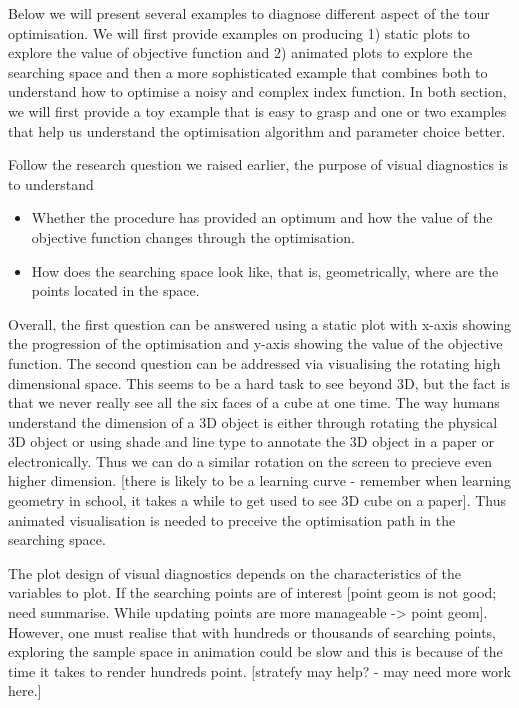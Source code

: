 \documentclass[12pt]{article}
\begin{document}
Below we will present several examples to diagnose different aspect of
the tour optimisation. We will first provide examples on producing 1)
static plots to explore the value of objective function and 2) animated
plots to explore the searching space and then a more sophisticated
example that combines both to understand how to optimise a noisy and
complex index function. In both section, we will first provide a toy
example that is easy to grasp and one or two examples that help us
understand the optimisation algorithm and parameter choice better.

Follow the research question we raised earlier, the purpose of visual
diagnostics is to understand

\begin{itemize}
\item
  Whether the procedure has provided an optimum and how the value of the
  objective function changes through the optimisation.
\item
  How does the searching space look like, that is, geometrically, where
  are the points located in the space.
\end{itemize}

Overall, the first question can be answered using a static plot with
x-axis showing the progression of the optimisation and y-axis showing
the value of the objective function. The second question can be
addressed via visualising the rotating high dimensional space. This
seems to be a hard task to see beyond 3D, but the fact is that we never
really see all the six faces of a cube at one time. The way humans
understand the dimension of a 3D object is either through rotating the
physical 3D object or using shade and line type to annotate the 3D
object in a paper or electronically. Thus we can do a similar rotation
on the screen to precieve even higher dimension. {[}there is likely to
be a learning curve - remember when learning geometry in school, it
takes a while to get used to see 3D cube on a paper{]}. Thus animated
visualisation is needed to preceive the optimisation path in the
searching space.

The plot design of visual diagnostics depends on the characteristics of
the variables to plot. If the searching points are of interest {[}point
geom is not good; need summarise. While updating points are more
manageable -\textgreater{} point geom{]}. However, one must realise that
with hundreds or thousands of searching points, exploring the sample
space in animation could be slow and this is because of the time it
takes to render hundreds point. {[}stratefy may help? - may need more
work here.{]}
\end{document}
